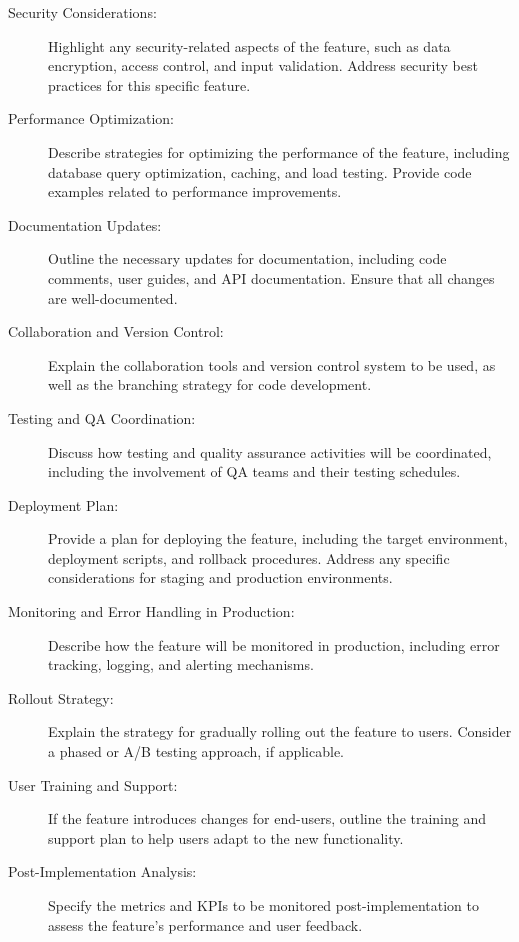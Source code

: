 \documentclass{article}
\begin{document}
\begin{description}
    \item[Security Considerations:]
    Highlight any security-related aspects of the feature, such as data encryption, access control, and input validation. Address security best practices for this specific feature.

    \item[Performance Optimization:]
    Describe strategies for optimizing the performance of the feature, including database query optimization, caching, and load testing. Provide code examples related to performance improvements.

    \item[Documentation Updates:]
    Outline the necessary updates for documentation, including code comments, user guides, and API documentation. Ensure that all changes are well-documented.

    \item[Collaboration and Version Control:]
    Explain the collaboration tools and version control system to be used, as well as the branching strategy for code development.

    \item[Testing and QA Coordination:]
    Discuss how testing and quality assurance activities will be coordinated, including the involvement of QA teams and their testing schedules.

    \item[Deployment Plan:]
    Provide a plan for deploying the feature, including the target environment, deployment scripts, and rollback procedures. Address any specific considerations for staging and production environments.

    \item[Monitoring and Error Handling in Production:]
    Describe how the feature will be monitored in production, including error tracking, logging, and alerting mechanisms.

    \item[Rollout Strategy:]
    Explain the strategy for gradually rolling out the feature to users. Consider a phased or A/B testing approach, if applicable.

    \item[User Training and Support:]
    If the feature introduces changes for end-users, outline the training and support plan to help users adapt to the new functionality.

    \item[Post-Implementation Analysis:]
    Specify the metrics and KPIs to be monitored post-implementation to assess the feature's performance and user feedback.


\end{description}
\end{document}

